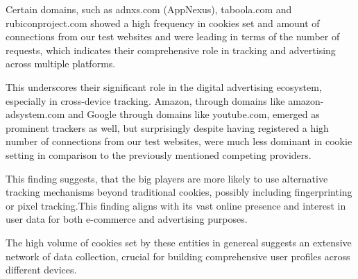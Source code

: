 Certain domains, such as adnxs.com (AppNexus), taboola.com and rubiconproject.com showed a high frequency in cookies set and amount of connections from our test websites and were leading in terms of the number of requests, which indicates their comprehensive role in tracking and advertising across multiple platforms.

This underscores their significant role in the digital advertising ecosystem, especially in cross-device tracking. Amazon, through domains like amazon-adsystem.com and Google through domains like youtube.com, emerged as prominent trackers as well, but surprisingly despite having registered a high number of connections from our test websites, were much less dominant in cookie setting in comparison to the previously mentioned competing providers. 

This finding suggests, that the big players are more likely to use alternative tracking mechanisms beyond traditional cookies, possibly including fingerprinting or pixel tracking.This finding aligns with its vast online presence and interest in user data for both e-commerce and advertising purposes.

The high volume of cookies set by these entities in genereal suggests an extensive network of data collection, crucial for building comprehensive user profiles across different devices.



